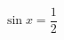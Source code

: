 \documentclass[border=0pt,12pt]{standalone}
\begin{document}
\fontsize{26}{31.2}\selectfont
$\sin x=\dfrac{1}{2}$%
\end{document}
